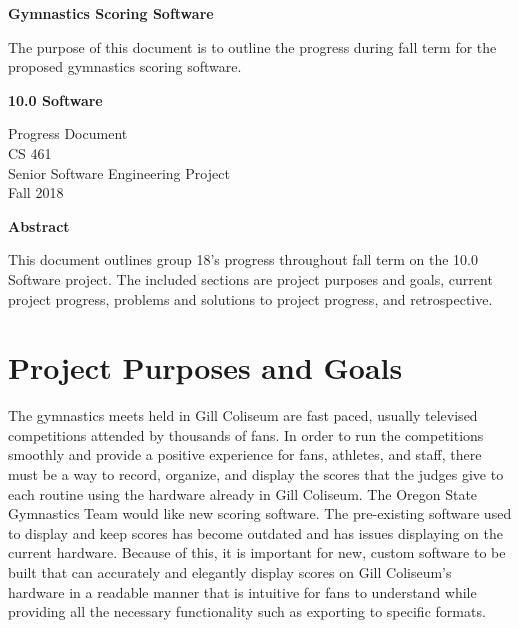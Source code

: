 \documentclass[letterpaper,10pt,draftclsnofoot,onecolumn,]{article}
\begin{document}
\noindent
\begin{titlepage}
    \begin{center}
        \vspace*{1cm}
        
        \textbf{\huge{Gymnastics Scoring Software}}
        
        \vspace{0.5cm}
        \large{The purpose of this document is to outline the progress during fall term for the proposed gymnastics scoring software.}
        
        \vspace{1.5cm}
        
        \textbf{\LARGE{10.0 Software}}
        
        \Large{Progress Document\\
        CS 461\\
        Senior Software Engineering Project\\
        Fall 2018}
        \vspace*{\fill}
        \begin{center}
            \textbf{\large{Abstract}}
        \end{center}
        \normalsize{This document outlines group 18's progress throughout fall term on the 10.0 Software project. The included sections are project purposes and goals, current project progress, problems and solutions to project progress, and retrospective.}
    \end{center}
\end{titlepage}
\section{Project Purposes and Goals}
The gymnastics meets held in Gill Coliseum are fast paced, usually televised competitions attended by thousands of fans. In order to run the competitions smoothly and provide a positive experience for fans, athletes, and staff, there must be a way to record, organize, and display the scores that the judges give to each routine using the hardware already in Gill Coliseum. The Oregon State Gymnastics Team would like new scoring software. The pre-existing software used to display and keep scores has become outdated and has issues displaying on the current hardware. Because of this, it is important for new, custom software to be built that can accurately and elegantly display scores on Gill Coliseum's hardware in a readable manner that is intuitive for fans to understand while providing all the necessary functionality such as exporting to specific formats.
\end{document}
